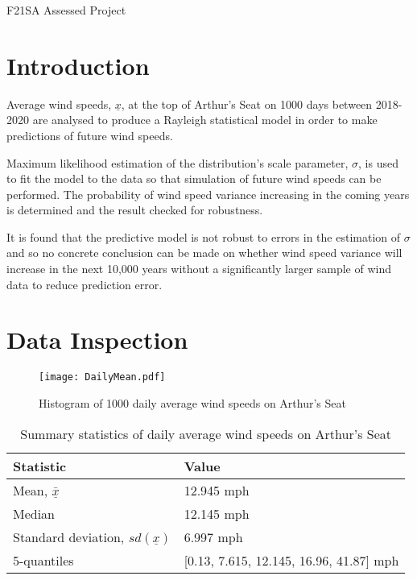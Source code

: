 \documentclass[11pt]{article}
\begin{document}
\begin{center}
    \Large{F21SA Assessed Project}
\end{center}

\section{Introduction}

Average wind speeds, $\underline{x}$, at the top of Arthur's Seat on 1000
days between 2018-2020 are analysed to produce a Rayleigh statistical
model in order to make predictions of future wind speeds.

Maximum likelihood estimation of the distribution's scale parameter,
$\sigma$, is used to fit the model to the data so that simulation of
future wind speeds can be performed. The probability of wind speed variance
increasing in the coming years is determined and the result checked for
robustness.

It is found that the predictive model is not robust to errors in the
estimation of $\sigma$ and so no concrete conclusion can be made on
whether wind speed variance will increase in the next 10,000 years
without a significantly larger sample of wind data to reduce prediction error.

\section{Data Inspection}

\begin{figure}[ht]
    \centering
	\texttt{[image: DailyMean.pdf]}
    \caption{Histogram of 1000 daily average wind speeds on Arthur's Seat}
    \label{fig:histogram}
\end{figure}


\begin{table}[ht]
    \centering
    \begin{tabular}{ll}
    Statistic & Value \\ \hline
    Mean, $\underline{\bar x}$ & 12.945 mph \\
    Median & 12.145 mph \\
    Standard deviation, $sd(\underline{x})$ & 6.997 mph \\
    5-quantiles & [0.13, 7.615, 12.145, 16.96, 41.87] mph
    \end{tabular}
    \caption{Summary statistics of daily average wind speeds on Arthur's Seat}
    \label{t:data}
\end{table}
\end{document}
